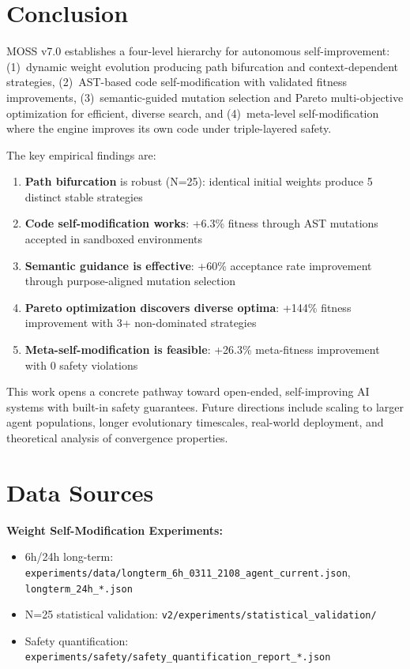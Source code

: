 \documentclass[11pt]{article}
\begin{document}
\section{Conclusion}

MOSS v7.0 establishes a four-level hierarchy for autonomous self-improvement: (1)~dynamic weight evolution producing path bifurcation and context-dependent strategies, (2)~AST-based code self-modification with validated fitness improvements, (3)~semantic-guided mutation selection and Pareto multi-objective optimization for efficient, diverse search, and (4)~meta-level self-modification where the engine improves its own code under triple-layered safety.

The key empirical findings are:
\begin{enumerate}
    \item \textbf{Path bifurcation} is robust (N=25): identical initial weights produce 5 distinct stable strategies
    \item \textbf{Code self-modification works}: +6.3\% fitness through AST mutations accepted in sandboxed environments
    \item \textbf{Semantic guidance is effective}: +60\% acceptance rate improvement through purpose-aligned mutation selection
    \item \textbf{Pareto optimization discovers diverse optima}: +144\% fitness improvement with 3+ non-dominated strategies
    \item \textbf{Meta-self-modification is feasible}: +26.3\% meta-fitness improvement with 0 safety violations
\end{enumerate}

This work opens a concrete pathway toward open-ended, self-improving AI systems with built-in safety guarantees. Future directions include scaling to larger agent populations, longer evolutionary timescales, real-world deployment, and theoretical analysis of convergence properties.


\section*{Data Sources}

\textbf{Weight Self-Modification Experiments:}
\begin{itemize}
    \item 6h/24h long-term: \texttt{experiments/data/longterm\_6h\_0311\_2108\_agent\_current.json}, \texttt{longterm\_24h\_*.json}
    \item N=25 statistical validation: \texttt{v2/experiments/statistical\_validation/}
    \item Safety quantification: \texttt{experiments/safety/safety\_quantification\_report\_*.json}
\end{itemize}
\end{document}
